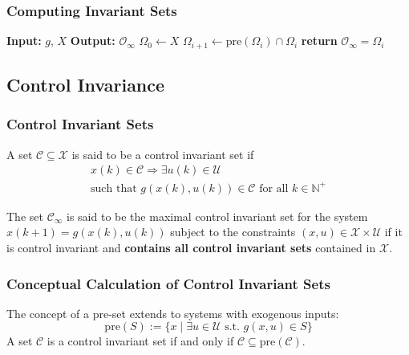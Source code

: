 \subsubsection{Computing Invariant Sets}

\begin{algorithmic}
    \State{} \textbf{Input:} $g$, $X$
    \State{} \textbf{Output:} $\mathcal{O}_\infty$
    \State{} $\Omega_0 \gets X$
    \State{} $\Omega_{i+1} \gets \text{pre}(\Omega_i) \cap \Omega_i$
    \State{} \textbf{return} $\mathcal{O}_\infty = \Omega_i$
    \EndIf{}
    \EndWhile{}
\end{algorithmic}

\subsection{Control Invariance}
\subsubsection{Control Invariant Sets}
A set $\mathcal{C} \subseteq \mathcal{X}$ is said to be a control invariant set if
\begin{gather*}
    x(k) \in \mathcal{C} \Rightarrow \exists u(k) \in \mathcal{U}\\
    \text{such that } g(x(k), u(k)) \in \mathcal{C} \text{ for all } k \in \mathbb{N}^+
\end{gather*}

\newpar{}

The set $\mathcal{C}_\infty$ is said to be the maximal control invariant set for the system $x(k + 1) = g(x(k), u(k))$ subject to the constraints $(x, u) \in \mathcal{X} \times \mathcal{U}$ if it is control invariant and \textbf{contains all control invariant sets} contained in $\mathcal{X}$.


\subsubsection{Conceptual Calculation of Control Invariant Sets}

The concept of a pre-set extends to systems with exogenous inputs:
\begin{equation*}
    \text{pre}(S) := \{x \mid \exists u \in \mathcal{U} \text{ s.t. } g(x, u) \in S \}
\end{equation*}
A set $\mathcal{C}$ is a control invariant set if and only if $\mathcal{C} \subseteq \text{pre}(\mathcal{C})$.

